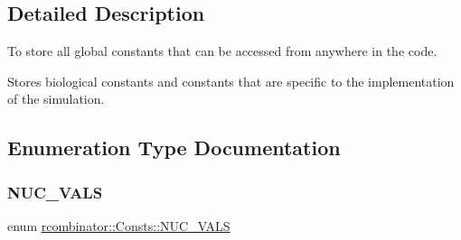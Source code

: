 \subsection{Detailed Description}
To store all global constants that can be accessed from anywhere in the code. 

Stores biological constants and constants that are specific to the implementation of the simulation. 

\subsection{Enumeration Type Documentation}
\mbox{\label{namespacercombinator_1_1Consts_aaa096a23d1bc2fdb1992265192fae907}} 
\subsubsection{\texorpdfstring{N\+U\+C\+\_\+\+V\+A\+LS}{NUC\_VALS}}
{\footnotesize\ttfamily enum \mbox{\hyperlink{namespacercombinator_1_1Consts_aaa096a23d1bc2fdb1992265192fae907}{rcombinator\+::\+Consts\+::\+N\+U\+C\+\_\+\+V\+A\+LS}}}

